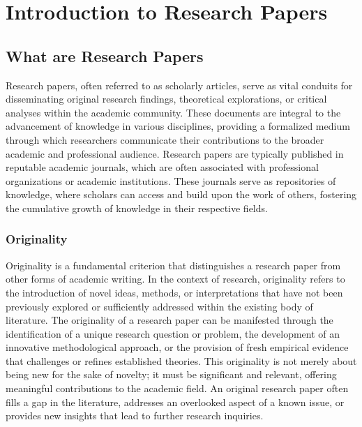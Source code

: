 \documentclass[
]{book}
\begin{document}
\chapter{Introduction to Research Papers}\label{introduction-to-research-papers}

\section{What are Research Papers}\label{what-are-research-papers}

Research papers, often referred to as scholarly articles, serve as vital conduits for disseminating original research findings, theoretical explorations, or critical analyses within the academic community. These documents are integral to the advancement of knowledge in various disciplines, providing a formalized medium through which researchers communicate their contributions to the broader academic and professional audience. Research papers are typically published in reputable academic journals, which are often associated with professional organizations or academic institutions. These journals serve as repositories of knowledge, where scholars can access and build upon the work of others, fostering the cumulative growth of knowledge in their respective fields.

\subsection*{Originality}\label{originality}

Originality is a fundamental criterion that distinguishes a research paper from other forms of academic writing. In the context of research, originality refers to the introduction of novel ideas, methods, or interpretations that have not been previously explored or sufficiently addressed within the existing body of literature. The originality of a research paper can be manifested through the identification of a unique research question or problem, the development of an innovative methodological approach, or the provision of fresh empirical evidence that challenges or refines established theories. This originality is not merely about being new for the sake of novelty; it must be significant and relevant, offering meaningful contributions to the academic field. An original research paper often fills a gap in the literature, addresses an overlooked aspect of a known issue, or provides new insights that lead to further research inquiries.
\end{document}
